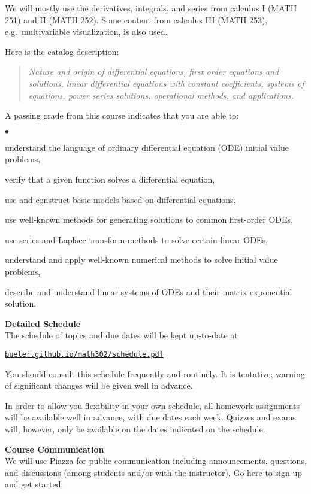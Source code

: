 \documentclass[12pt]{article}
\renewcommand{\emph}[1]{\textsf{\textbf{#1}}}
\newcommand{\localhead}[1]{\par\smallskip\textbf{#1}\nobreak\\}%
\def\heading#1{\localhead{\large\emph{#1}}}
\newenvironment{clist}%
{\bgroup\parskip 0pt\begin{list}{$\bullet$}{\partopsep 4pt\topsep 0pt\itemsep -2pt}}%
{\end{list}\egroup}%
\begin{document}
We will mostly use the derivatives, integrals, and series from calculus I (MATH 251) and II (MATH 252).  Some content from calculus III (MATH 253), e.g.~multivariable visualization, is also used.

Here is the catalog description:
\begin{quote}
\textsl{Nature and origin of differential equations, first order equations and solutions, linear differential equations with constant coefficients, systems of equations, power series solutions, operational methods, and applications.}
\end{quote}

A passing grade from this course indicates that you are able to:

\begin{clist}
\item understand the language of ordinary differential equation (ODE) initial value problems,
\item verify that a given function solves a differential equation,
\item use and construct basic models based on differential equations,
\item use well-known methods for generating solutions to common first-order ODEs,
\item use series and Laplace transform methods to solve certain linear ODEs,
\item understand and apply well-known numerical methods to solve initial value problems,
\item describe and understand linear systems of ODEs and their matrix exponential solution.
\end{clist}


\heading{Detailed Schedule}
The schedule of topics and due dates will be kept up-to-date at

\smallskip
\centerline{\href{https://bueler.github.io/math302/schedule.pdf}{\tt bueler.github.io/math302/schedule.pdf}}

You should consult this schedule frequently and routinely.  It is tentative; warning of significant changes will be given well in advance.

In order to allow you flexibility in your own schedule, all homework assignments will be available well in advance, with due dates each week.  Quizzes and exams will, however, only be available on the dates indicated on the schedule.


\heading{Course Communication}
We will use Piazza for public communication including announcements, questions, and discussions (among students and/or with the instructor).  Go here to sign up and get started:
\end{document}
